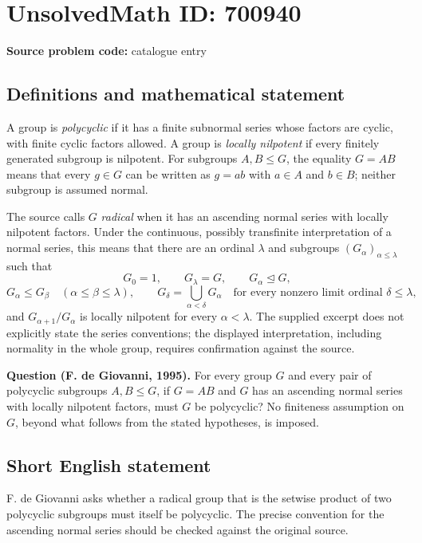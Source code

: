 \documentclass[11pt]{article}
\begin{document}
\section*{UnsolvedMath ID: 700940}
\textbf{Source problem code:} catalogue entry
\subsection{Definitions and mathematical statement}
A group is \emph{polycyclic} if it has a finite subnormal series whose factors are cyclic, with finite cyclic factors allowed. A group is \emph{locally nilpotent} if every finitely generated subgroup is nilpotent. For subgroups \(A,B\leq G\), the equality \(G=AB\) means that every \(g\in G\) can be written as \(g=ab\) with \(a\in A\) and \(b\in B\); neither subgroup is assumed normal.

The source calls \(G\) \emph{radical} when it has an ascending normal series with locally nilpotent factors. Under the continuous, possibly transfinite interpretation of a normal series, this means that there are an ordinal \(\lambda\) and subgroups \((G_\alpha)_{\alpha\leq\lambda}\) such that
\[
G_0=1,\qquad G_\lambda=G,\qquad G_\alpha\trianglelefteq G,
\]
\[
G_\alpha\leq G_\beta\quad(\alpha\leq\beta\leq\lambda),\qquad
G_\delta=\bigcup_{\alpha<\delta}G_\alpha
\quad\text{for every nonzero limit ordinal }\delta\leq\lambda,
\]
and \(G_{\alpha+1}/G_\alpha\) is locally nilpotent for every \(\alpha<\lambda\). The supplied excerpt does not explicitly state the series conventions; the displayed interpretation, including normality in the whole group, requires confirmation against the source.

\textbf{Question (F. de Giovanni, 1995).} For every group \(G\) and every pair of polycyclic subgroups \(A,B\leq G\), if \(G=AB\) and \(G\) has an ascending normal series with locally nilpotent factors, must \(G\) be polycyclic? No finiteness assumption on \(G\), beyond what follows from the stated hypotheses, is imposed.
\subsection{Short English statement}
F. de Giovanni asks whether a radical group that is the setwise product of two polycyclic subgroups must itself be polycyclic. The precise convention for the ascending normal series should be checked against the original source.
\end{document}
